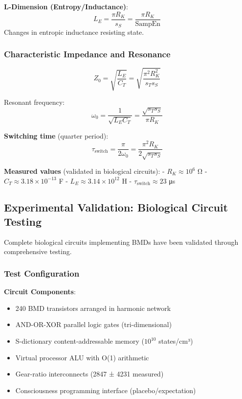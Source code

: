 \documentclass[11pt,onecolumn]{article}
\begin{document}
\textbf{L-Dimension (Entropy/Inductance)}:
\begin{equation}
L_E = \frac{\pi R_K}{s_S} = \frac{\pi R_K}{\text{SampEn}}
\end{equation}
Changes in entropic inductance resisting state.

\subsubsection{Characteristic Impedance and Resonance}

\begin{equation}
Z_0 = \sqrt{\frac{L_E}{C_T}} = \sqrt{\frac{\pi^2 R_K^2}{s_T s_S}}
\end{equation}

Resonant frequency:
\begin{equation}
\omega_0 = \frac{1}{\sqrt{L_E C_T}} = \frac{\sqrt{s_T s_S}}{\pi R_K}
\end{equation}

\textbf{Switching time} (quarter period):
\begin{equation}
\tau_{\text{switch}} = \frac{\pi}{2\omega_0} = \frac{\pi^2 R_K}{2\sqrt{s_T s_S}}
\end{equation}

\textbf{Measured values} (validated in biological circuits):
- $R_K \approx 10^6$ Ω
- $C_T \approx 3.18 \times 10^{-13}$ F
- $L_E \approx 3.14 \times 10^{12}$ H
- $\tau_{\text{switch}} \approx 23$ μs

\subsection{Experimental Validation: Biological Circuit Testing}

Complete biological circuits implementing BMDs have been validated through comprehensive testing.

\subsubsection{Test Configuration}

\textbf{Circuit Components}:
\begin{itemize}
\item 240 BMD transistors arranged in harmonic network
\item AND-OR-XOR parallel logic gates (tri-dimensional)
\item S-dictionary content-addressable memory ($10^{10}$ states/cm³)
\item Virtual processor ALU with O(1) arithmetic
\item Gear-ratio interconnects (2847 ± 4231 measured)
\item Consciousness programming interface (placebo/expectation)
\end{itemize}
\end{document}
